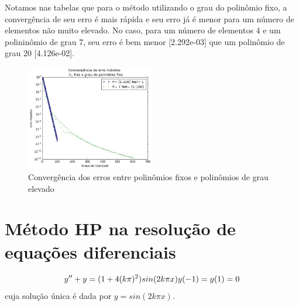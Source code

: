  Notamos nas tabelas  que para o método utilizando o grau do polinômio fixo, a convergência de seu erro é mais rápida  e seu erro já é menor para um número de elementos não muito elevado. No caso, para um número de elementos 4 e um polininômio de grau 7, seu erro é bem menor [2.292e-03] que um polinômio de grau 20 [4.126e-02].
 
\begin{figure}[!hb]
  \includegraphics[width=0.5\textwidth,center]{figuras/convergencia_erro_FEM2.png}
  \caption{Convergência dos erros entre polinômios fixos e polinômios de grau elevado}
\end{figure}

\section{Método HP na resolução de equações diferenciais}

\begin{equation}
	y'' + y = (1 + 4 (k \pi)^2)sin(2 k \pi x) \\
	y(-1) = y(1) = 0 \\
\end{equation}
 cuja solução única é dada por $y = sin(2 k \pi x)$.


